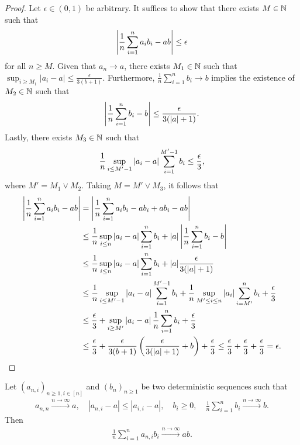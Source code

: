 \begin{proof}
    Let $\epsilon \in (0, 1)$ be arbitrary. It suffices to show that there exists $M\in\mathbb{N}$ such that 
    \begin{align*}
        \left|  \frac{1}{n}\sum_{i=1}^n a_i b_i - ab\right| \leq \epsilon 
    \end{align*}
    for all $n \geq M$.
    Given that $a_n \to a$, there exists $M_1 \in \mathbb{N}$ such that $\sup_{i \geq M_1} |a_i - a| \leq \frac{\epsilon}{3 (b+1)}$. Furthermore, $\frac{1}{n}\sum_{i=1}^n b_i \to b$ implies the existence of $M_2\in\mathbb{N}$ such that
    \begin{align*}
        \left| \frac{1}{n}\sum_{i=1}^n b_i - b \right| \leq \frac{\epsilon}{3 (|a| + 1)}.
    \end{align*}
    Lastly, there exists $M_3 \in\mathbb{N}$ such that
    \begin{align*}
         \frac{1}{n}\sup_{i \leq M'-1}\left| a_i - a \right| \sum_{i=1}^{M'-1} b_i \leq \frac{\epsilon}{3},
    \end{align*}
    where $M' = M_1 \vee M_2$. Taking $M = M'\vee M_3$, it follows that
    \begin{align*}
        \left|  \frac{1}{n}\sum_{i=1}^n a_i b_i - ab\right| &= \left|  \frac{1}{n}\sum_{i=1}^n a_i b_i - ab_i + ab_i - ab\right|
        \\&\leq   \frac{1}{n}\sup_{i \leq n}\left| a_i - a \right| \sum_{i=1}^n b_i + |a| \left|\frac{1}{n}\sum_{i=1}^n  b_i - b\right|
        \\&\leq   \frac{1}{n}\sup_{i \leq n}\left| a_i -a\right| \sum_{i=1}^n b_i + |a| \frac{\epsilon}{3 (|a| + 1)}
        \\&\leq   \frac{1}{n}\sup_{i \leq M'-1}\left| a_i -a\right| \sum_{i=1}^{M'-1} b_i+\frac{1}{n}\sup_{M' \leq i \leq n}\left| a_i \right| \sum_{i=M'}^{n} b_i + \frac{\epsilon}{3}
        \\&\leq   \frac{\epsilon}{3} +\sup_{i \geq M'}\left| a_i-a \right| \frac{1}{n} \sum_{i=1}^{n} b_i + \frac{\epsilon}{3}
        \\&\leq   \frac{\epsilon}{3} +\frac{\epsilon}{3 (b+1)} \left( \frac{\epsilon}{3 (|a| + 1)} + b\right)  + \frac{\epsilon}{3}
        \leq   \frac{\epsilon}{3} +\frac{\epsilon}{3}  + \frac{\epsilon}{3}
        = \epsilon.
    \end{align*}
\end{proof}


\begin{lemma} \label{lemma:anibiab}
    Let $(a_{n, i})_{n \geq 1, i \in[n]}$ and $(b_n)_{n \geq 1}$ be two deterministic sequences such that 
    \begin{align*}
        a_{n, n} \stackrel{n\to\infty}{\to} a, \quad |a_{n, i} - a| \leq |a_{i, i} - a|, \quad b_i \geq 0, \quad \frac{1}{n}\sum_{i=1}^n b_i \stackrel{n\to\infty}{\to} b.
    \end{align*}
    Then
    \begin{align*}
         \frac{1}{n}\sum_{i=1}^n a_{n, i} b_i \stackrel{n\to\infty}{\to} ab.
    \end{align*}
\end{lemma}

